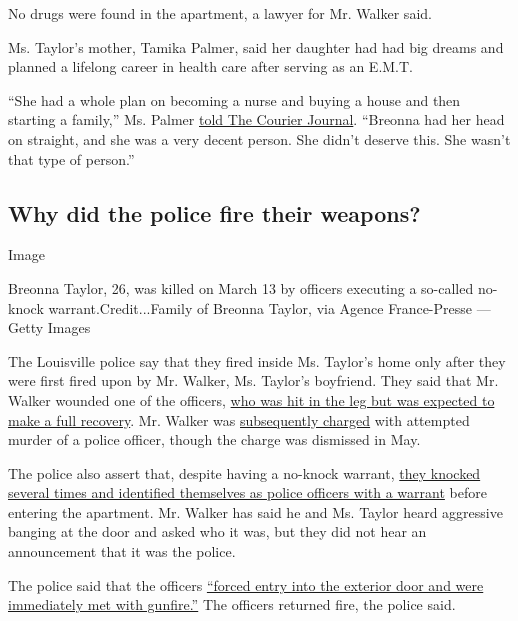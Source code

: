No drugs were found in the apartment, a lawyer for Mr. Walker said.

Ms. Taylor's mother, Tamika Palmer, said her daughter had had big dreams
and planned a lifelong career in health care after serving as an E.M.T.

``She had a whole plan on becoming a nurse and buying a house and then
starting a family,'' Ms. Palmer
\href{https://www.courier-journal.com/story/news/local/2020/05/12/breonna-taylor-case-what-know-louisville-emt-killed-cops/3110066001/}{told
The Courier Journal}. ``Breonna had her head on straight, and she was a
very decent person. She didn't deserve this. She wasn't that type of
person.''

\hypertarget{why-did-the-police-fire-their-weapons}{%
\subsection{Why did the police fire their
weapons?}\label{why-did-the-police-fire-their-weapons}}

Image

Breonna Taylor, 26, was killed on March 13 by officers executing a
so-called no-knock warrant.Credit...Family of Breonna Taylor, via Agence
France-Presse --- Getty Images

The Louisville police say that they fired inside Ms. Taylor's home only
after they were first fired upon by Mr. Walker, Ms. Taylor's boyfriend.
They said that Mr. Walker wounded one of the officers,
\href{https://www.facebookcorewwwi.onion/LMPD.ky/videos/206839417221050/}{who
was hit in the leg but was expected to make a full recovery}. Mr. Walker
was
\href{https://www.facebookcorewwwi.onion/LMPD.ky/videos/206839417221050/}{subsequently
charged} with attempted murder of a police officer, though the charge
was dismissed in May.

The police also assert that, despite having a no-knock warrant,
\href{https://www.facebookcorewwwi.onion/LMPD.ky/videos/206839417221050/}{they
knocked several times and identified themselves as police officers with
a warrant} before entering the apartment. Mr. Walker has said he and Ms.
Taylor heard aggressive banging at the door and asked who it was, but
they did not hear an announcement that it was the police.

The police said that the officers
\href{https://www.facebookcorewwwi.onion/LMPD.ky/videos/206839417221050/}{``forced
entry into the exterior door and were immediately met with gunfire.''}
The officers returned fire, the police said.

